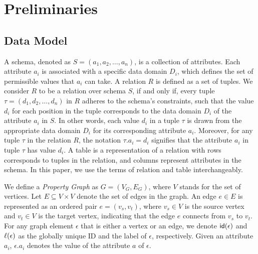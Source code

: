 \section{Preliminaries}
\label{sec:preliminaries}



\subsection{Data Model}
\label{sec:data-model}

A schema, denoted as \(S = (a_1, a_2, \ldots, a_n)\), is a collection of attributes. Each attribute \(a_i\) is associated with a specific data domain \(D_i\), which defines the set of permissible values that \(a_i\) can take.
A relation \(R\) is defined as a set of tuples. We consider \(R\) to be a relation over schema \(S\), if and only if, every tuple \(\tau = (d_1, d_2, \ldots, d_n)\) in \(R\) adheres to the schema's constraints, such that the value \(d_i\) for each position in the tuple corresponds to the data domain \(D_i\) of the attribute \(a_i\) in \(S\). In other words, each value \(d_i\) in a tuple \(\tau\) is drawn from the appropriate data domain \(D_i\) for its corresponding attribute \(a_i\).
Moreover, for any tuple \(\tau\) in the relation \(R\), the notation \(\tau.a_i = d_i\) signifies that the attribute \(a_i\) in tuple \(\tau\) has value \(d_i\).
A table is a representation of a relation with rows corresponds to tuples in the relation, and columns represent attributes in the schema. In this paper, we use the terms of relation and table interchangeably.

We define a \emph{Property Graph} as $G = (V_G, E_G)$,
where $V$ stands for the set of vertices. Let $E \subseteq V \times V$ denote the set of edges in the graph. An edge $e \in E$ is represented as an ordered pair $e = (v_s, v_t)$, where $v_s \in V$ is the source vertex and $v_t \in V$ is the target vertex, indicating that the edge $e$ connects from $v_s$ to $v_t$.
For any graph element $\epsilon$ that is either a vertex or an edge, we denote ${\mathsf{id}}(\epsilon)$ and $\mathcal{\ell}(\epsilon)$ as the globally unique ID and the label of $\epsilon$, respectively. Given an attribute $a_i$, $\epsilon.a_i$ denotes the value of the attribute $a$ of $\epsilon$.

